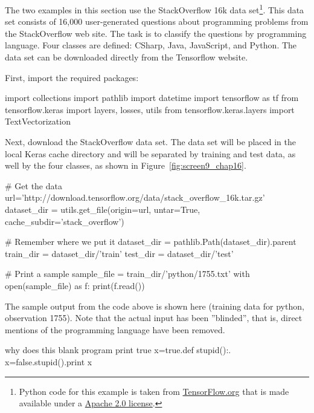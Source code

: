 \begin{withcode}
The two examples in this section use the StackOverflow 16k data set\footnote{Python code for this example is taken from \href{https://www.tensorflow.org/tutorials/load_data/text}{TensorFlow.org} that is made available under a \href{https://www.apache.org/licenses/LICENSE-2.0}{Apache 2.0 license}.}. This data set consists of 16,000 user-generated questions about programming problems from the StackOverflow web site. The task is to classify the questions by programming language. Four classes are defined: CSharp, Java, JavaScript, and Python. The data set can be downloaded directly from the Tensorflow website.

First, import the required packages:

\begin{pythoncode}
import collections
import pathlib
import datetime
import tensorflow as tf
from tensorflow.keras import layers, losses, utils
from tensorflow.keras.layers import TextVectorization
\end{pythoncode}

Next, download the StackOverflow data set. The data set will be placed in the local Keras cache directory and will be separated by training and test data, as well by the four classes, as shown in Figure~\ref{fig:screen9_chap16}.

\begin{pythoncode}
# Get the data
url='http://download.tensorflow.org/data/stack_overflow_16k.tar.gz'
dataset_dir = utils.get_file(origin=url, untar=True,
        cache_subdir='stack_overflow')

# Remember where we put it
dataset_dir = pathlib.Path(dataset_dir).parent
train_dir = dataset_dir/'train'
test_dir = dataset_dir/'test'

# Print a sample
sample_file = train_dir/'python/1755.txt'
with open(sample_file) as f:
  print(f.read())
\end{pythoncode}

The sample output from the code above is shown here (training data for python, observation 1755). Note that the actual input has been ''blinded'', that is, direct mentions of the programming language have been removed.

\begin{textcode}
why does this blank program print true x=true.def stupid():.
x=false.stupid().print x
\end{textcode}

\begin{figure}
\centering


\end{figure}
\end{withcode}
